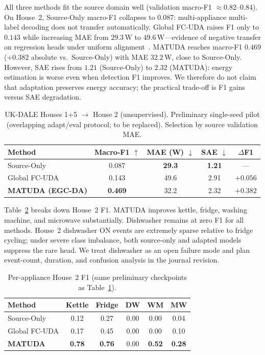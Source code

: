 \documentclass[journal]{IEEEtran}
\begin{document}
All three methods fit the source domain well (validation macro-F1 $\approx 0.82$--$0.84$).
On House~2, Source-Only macro-F1 collapses to $0.087$: multi-appliance multi-label decoding does not transfer automatically.
Global FC-UDA raises F1 only to $0.143$ while increasing MAE from $29.3$\,W to $49.6$\,W---evidence of negative transfer on regression heads under uniform alignment~\cite{muaz2024when}.
MATUDA reaches macro-F1 $0.469$ ($+0.382$ absolute vs.\ Source-Only) with MAE $32.2$\,W, close to Source-Only.
However, SAE rises from $1.21$ (Source-Only) to $2.32$ (MATUDA): energy estimation is worse even when detection F1 improves.
We therefore do not claim that adaptation preserves energy accuracy; the practical trade-off is F1 gains versus SAE degradation.

\begin{table}[!t]
\caption{UK-DALE Houses 1+5 $\rightarrow$ House 2 (unsupervised). Preliminary single-seed pilot (overlapping adapt/eval protocol; to be replaced). Selection by source validation MAE.}
\label{tab:main}
\centering
\scriptsize
\begin{tabular}{@{}lcccc@{}}
\toprule
Method & Macro-F1 $\uparrow$ & MAE (W) $\downarrow$ & SAE $\downarrow$ & $\Delta$F1 \\
\midrule
Source-Only & 0.087 & \textbf{29.3} & \textbf{1.21} & --- \\
Global FC-UDA & 0.143 & 49.6 & 2.91 & $+0.056$ \\
\textbf{MATUDA (EGC-DA)} & \textbf{0.469} & 32.2 & 2.32 & $\mathbf{+0.382}$ \\
\bottomrule
\end{tabular}
\end{table}

Table~\ref{tab:perapp} breaks down House~2 F1.
MATUDA improves kettle, fridge, washing machine, and microwave substantially.
Dishwasher remains at zero F1 for all methods.
House~2 dishwasher ON events are extremely sparse relative to fridge cycling; under severe class imbalance, both source-only and adapted models suppress the rare head.
We treat dishwasher as an open failure mode and plan event-count, duration, and confusion analysis in the journal revision.

\begin{table}[!t]
\caption{Per-appliance House~2 F1 (same preliminary checkpoints as Table~\ref{tab:main}).}
\label{tab:perapp}
\centering
\scriptsize
\begin{tabular}{@{}lccccc@{}}
\toprule
Method & Kettle & Fridge & DW & WM & MW \\
\midrule
Source-Only & 0.12 & 0.27 & 0.00 & 0.00 & 0.04 \\
Global FC-UDA & 0.17 & 0.45 & 0.00 & 0.00 & 0.10 \\
\textbf{MATUDA} & \textbf{0.78} & \textbf{0.76} & 0.00 & \textbf{0.52} & \textbf{0.28} \\
\bottomrule
\end{tabular}
\end{table}
\end{document}
